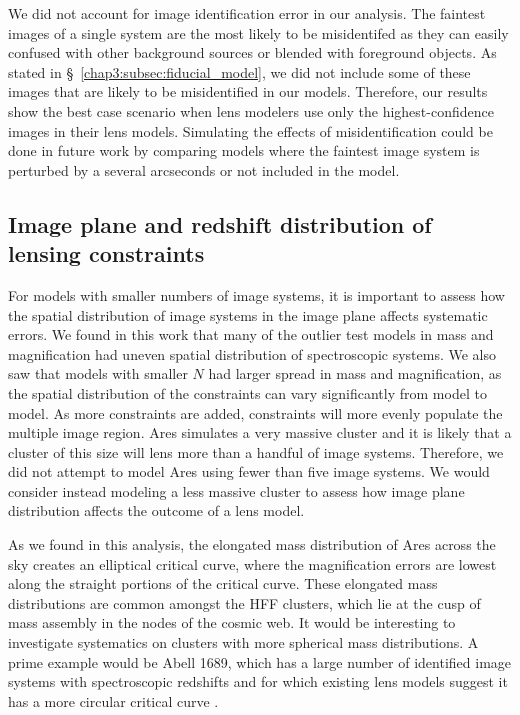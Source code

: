 We did not account for image identification error in our analysis. The faintest images of a single system are the most likely to be misidentifed as they can easily confused with other background sources or blended with foreground objects. As stated in \S~\ref{chap3:subsec:fiducial_model}, we did not include some of these images that are likely to be misidentified in our models. Therefore, our results show the best case scenario when lens modelers use only the highest-confidence images in their lens models. Simulating the effects of misidentification could be done in future work by comparing models where the faintest image system is perturbed by a several arcseconds or not included in the model.

\subsection{Image plane and redshift distribution of lensing constraints}
For models with smaller numbers of image systems, it is important to assess how the spatial distribution of image systems in the image plane affects systematic errors. We found in this work that many of the outlier test models in mass and magnification had uneven spatial distribution of spectroscopic systems. We also saw that models with smaller $N$ had larger spread in mass and magnification, as the spatial distribution of the constraints can vary significantly from model to model. As more constraints are added, constraints will more evenly populate the multiple image region. Ares simulates a very massive cluster and it is likely that a cluster of this size will lens more than a handful of image systems. Therefore, we did not attempt to model Ares using fewer than five image systems. We would consider instead modeling a less massive cluster to assess how image plane distribution affects the outcome of a lens model.

As we found in this analysis, the elongated mass distribution of Ares across the sky creates an elliptical critical curve, where the magnification errors are lowest along the straight portions of the critical curve. These elongated mass distributions are common amongst the HFF clusters, which lie at the cusp of mass assembly in the nodes of the cosmic web. It would be interesting to investigate systematics on clusters with more spherical mass distributions. A prime example would be Abell 1689, which has a large number of identified image systems with spectroscopic redshifts and for which existing lens models suggest it has a more circular critical curve \citep{Diego:2015tg,Coe:2010fy,Limousin:2007fk,Broadhurst:2005qy}.

